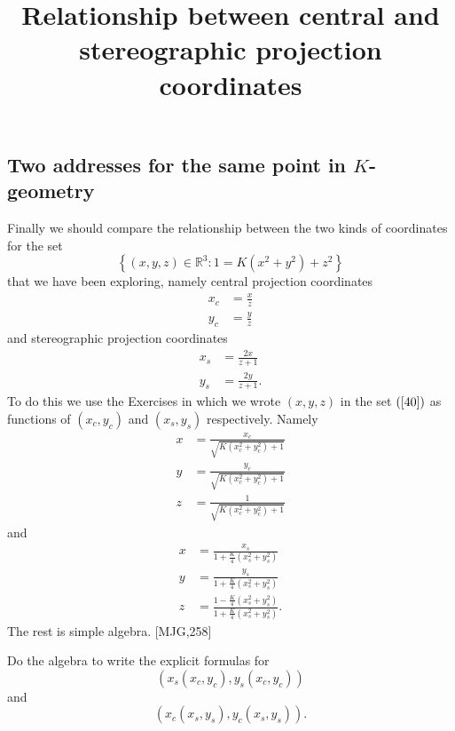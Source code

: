 \documentclass{ximera}
\title{Relationship between central and stereographic projection
  coordinates}
\begin{document}
\begin{abstract}
\end{abstract}
\maketitle


\subsection*{Two addresses for the same point in $K$-geometry}

Finally we should compare the relationship between the two kinds of
coordinates for the set%
\begin{equation}
\left\{  \left(  x,y,z\right)  \in\mathbb{R}^{3}:1=K\left(  x^{2}%
+y^{2}\right)  +z^{2}\right\}  \label{40}%
\end{equation}
that we have been exploring, namely central projection coordinates%
\begin{align}
x_{c}  &  =\frac{x}{z}\label{70}\\
y_{c}  &  =\frac{y}{z}\nonumber
\end{align}
and stereographic projection coordinates%
\begin{align}
x_{s}  &  =\frac{2x}{z+1}\label{71}\\
y_{s}  &  =\frac{2y}{z+1}.\nonumber
\end{align}
To do this we use the Exercises in which we wrote $\left(  x,y,z\right)  $ in
the set $\left(  \ref{40}\right)  $ as functions of $\left(  x_{c}%
,y_{c}\right)  $ and $\left(  x_{s},y_{s}\right)  $ respectively. Namely%
\begin{align*}
x  &  =\frac{x_{c}}{\sqrt{K\left(  x_{c}^{2}+y_{c}^{2}\right)  +1}}\\
y  &  =\frac{y_{c}}{\sqrt{K\left(  x_{c}^{2}+y_{c}^{2}\right)  +1}}\\
z  &  =\frac{1}{\sqrt{K\left(  x_{c}^{2}+y_{c}^{2}\right)  +1}}%
\end{align*}
and%
\begin{align*}
x  &  =\frac{x_{s}}{1+\frac{K}{4}\left(  x_{s}^{2}+y_{s}^{2}\right)  }\\
y  &  =\frac{y_{s}}{1+\frac{K}{4}\left(  x_{s}^{2}+y_{s}^{2}\right)  }\\
z  &  =\frac{1-\frac{K}{4}\left(  x_{s}^{2}+y_{s}^{2}\right)  }{1+\frac{K}%
{4}\left(  x_{s}^{2}+y_{s}^{2}\right)  }.
\end{align*}
The rest is simple algebra. [MJG,258]

\begin{exercise}
Do the algebra to write the explicit formulas for%
\[
\left(  x_{s}\left(  x_{c},y_{c}\right)  ,y_{s}\left(  x_{c},y_{c}\right)
\right)
\]
and%
\[
\left(  x_{c}\left(  x_{s},y_{s}\right)  ,y_{c}\left(  x_{s},y_{s}\right)
\right)  .
\]

\end{exercise}
\end{document}

